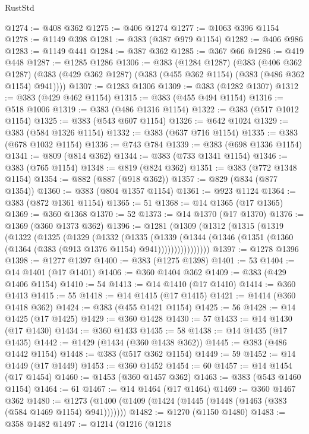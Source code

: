 \begin{lexlean}{RustStd}
\begin{coremodule}
@1274 := @408 @362
@1275 := @406 @1274
@1277 := @1063 @396 @1154
@1278 := @1149 @398
@1281 := @383 (@387 @979 @1154)
@1282 := @406 @986
@1283 := @1149 @441
@1284 := @387 @362
@1285 := @367 @66
@1286 := @419 @448
@1287 := @1285 @1286
@1306 := @383
    (@1284 @1287)
    (@383
      (@406 @362 @1287)
      (@383 (@429 @362 @1287) (@383 (@455 @362 @1154) (@383 (@486 @362 @1154) @941))))
@1307 := @1283 @1306
@1309 := @383 (@1282 @1307)
@1312 := @383 (@429 @462 @1154)
@1315 := @383 (@455 @494 @1154)
@1316 := @518 @1006
@1319 := @383 (@486 @1316 @1154)
@1322 := @383 (@517 @1012 @1154)
@1325 := @383 (@543 @607 @1154)
@1326 := @642 @1024
@1329 := @383 (@584 @1326 @1154)
@1332 := @383 (@637 @716 @1154)
@1335 := @383 (@678 @1032 @1154)
@1336 := @743 @784
@1339 := @383 (@698 @1336 @1154)
@1341 := @809 (@814 @362)
@1344 := @383 (@733 @1341 @1154)
@1346 := @383 (@765 @1154)
@1348 := @819 (@824 @362)
@1351 := @383 (@772 @1348 @1154)
@1354 := @882 (@887 (@918 @362))
@1357 := @829 (@834 (@877 @1354))
@1360 := @383 (@804 @1357 @1154)
@1361 := @923 @1124
@1364 := @383 (@872 @1361 @1154)
@1365 := 51
@1368 := @14 @1365 (@17 @1365)
@1369 := @360 @1368
@1370 := 52
@1373 := @14 @1370 (@17 @1370)
@1376 := @1369 (@360 @1373 @362)
@1396 := @1281
    (@1309
      (@1312
        (@1315
          (@1319
            (@1322
              (@1325
                (@1329
                  (@1332
                    (@1335
                      (@1339
                        (@1344
                          (@1346 (@1351 (@1360 (@1364 (@383 (@913 @1376 @1154) @941))))))))))))))))
@1397 := @1278 @1396
@1398 := @1277 @1397
@1400 := @383 (@1275 @1398)
@1401 := 53
@1404 := @14 @1401 (@17 @1401)
@1406 := @360 @1404 @362
@1409 := @383 (@429 @1406 @1154)
@1410 := 54
@1413 := @14 @1410 (@17 @1410)
@1414 := @360 @1413
@1415 := 55
@1418 := @14 @1415 (@17 @1415)
@1421 := @1414 (@360 @1418 @362)
@1424 := @383 (@455 @1421 @1154)
@1425 := 56
@1428 := @14 @1425 (@17 @1425)
@1429 := @360 @1428
@1430 := 57
@1433 := @14 @1430 (@17 @1430)
@1434 := @360 @1433
@1435 := 58
@1438 := @14 @1435 (@17 @1435)
@1442 := @1429 (@1434 (@360 @1438 @362))
@1445 := @383 (@486 @1442 @1154)
@1448 := @383 (@517 @362 @1154)
@1449 := 59
@1452 := @14 @1449 (@17 @1449)
@1453 := @360 @1452
@1454 := 60
@1457 := @14 @1454 (@17 @1454)
@1460 := @1453 (@360 @1457 @362)
@1463 := @383 (@543 @1460 @1154)
@1464 := 61
@1467 := @14 @1464 (@17 @1464)
@1469 := @360 @1467 @362
@1480 := @1273 (@1400 (@1409 (@1424 (@1445 (@1448 (@1463 (@383 (@584 @1469 @1154) @941)))))))
@1482 := @1270 (@1150 @1480)
@1483 := @358 @1482
@1497 := @1214
    (@1216
      (@1218

\end{coremodule}
\end{lexlean}
